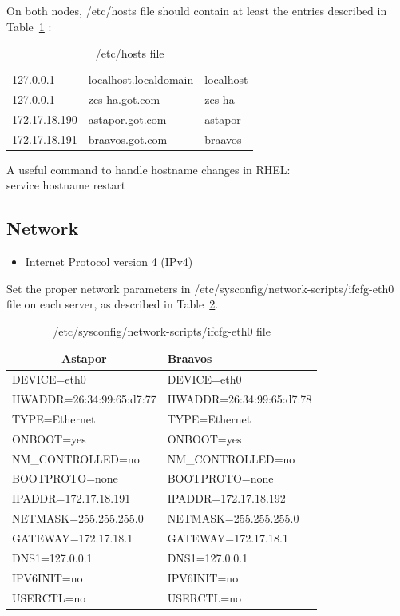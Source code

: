 \documentclass[a4paper, 12pt]{book}
\begin{document}
\noindent On both nodes, /etc/hosts file should contain at least the entries described in Table~\ref{table:hosts} :

\FloatBarrier
\begin{table}[H]
  \centering
  \begin{tabular}{ | l l l | }
    \hline    
    127.0.0.1     & localhost.localdomain & localhost \\
    127.0.0.1     & zcs-ha.got.com        & zcs-ha\\
	172.17.18.190 & astapor.got.com       & astapor\\
	172.17.18.191 & braavos.got.com       & braavos\\
    \hline
  \end{tabular}
\caption{/etc/hosts file}
\label{table:hosts}
\end{table}

\noindent A useful command to handle hostname changes in RHEL:\\
service hostname restart\\


\subsection{Network}
\label{sec:network}

\begin{itemize}
	\item Internet Protocol version 4 (IPv4)
\end{itemize}

\noindent Set the proper network parameters in /etc/sysconfig/network-scripts/ifcfg-eth0 file on each server, as described in Table~\ref{table:ifcfg}.

\FloatBarrier
\begin{table}[H]
  \centering
  \begin{tabular}{ | l | l | }
    \hline
    \multicolumn{1}{|c|}{Astapor} & Braavos \\
    \hline
    DEVICE=eth0 & DEVICE=eth0 \\
    HWADDR=26:34:99:65:d7:77 & HWADDR=26:34:99:65:d7:78\\
    TYPE=Ethernet & TYPE=Ethernet\\
    ONBOOT=yes & ONBOOT=yes\\
    NM\_CONTROLLED=no & NM\_CONTROLLED=no\\
    BOOTPROTO=none & BOOTPROTO=none\\
    IPADDR=172.17.18.191 & IPADDR=172.17.18.192\\
    NETMASK=255.255.255.0 & NETMASK=255.255.255.0\\
    GATEWAY=172.17.18.1	& GATEWAY=172.17.18.1\\
	DNS1=127.0.0.1 & DNS1=127.0.0.1\\
	IPV6INIT=no & IPV6INIT=no\\
	USERCTL=no & USERCTL=no\\
    \hline
  \end{tabular}
\caption{/etc/sysconfig/network-scripts/ifcfg-eth0 file}
\label{table:ifcfg}
\end{table}
\end{document}
